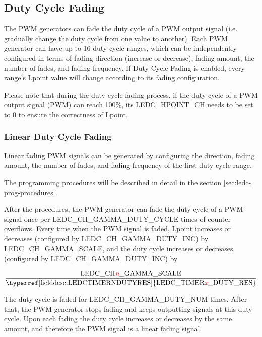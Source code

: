 \documentclass[main\_\_EN.tex]{subfiles}
\begin{document}
\subsection{Duty Cycle Fading}

The PWM generators can fade the duty cycle of a PWM output signal (i.e. gradually change the duty cycle from one value to another). Each PWM generator can have up to 16 duty cycle ranges, which can be independently configured in terms of fading direction (increase or decrease), fading amount, the number of fades, and fading frequency. If Duty Cycle Fading is enabled, every range's Lpoint value will change according to its fading configuration.

Please note that during the duty cycle fading process, if the duty cycle of a PWM output signal (PWM) can reach 100\%, its \hyperref[fielddesc:LEDCHPOINTCHN]{LEDC\_HPOINT\_CH} needs to be set to 0 to ensure the correctness of Lpoint.

\subsubsection{Linear Duty Cycle Fading}
\label{sec:ledc-pwm-linear-duty-cycle-fading}

Linear fading PWM signals can be generated by configuring the direction, fading amount, the number of fades, and fading frequency of the first duty cycle range.

The programming procedures will be described in detail in the section \ref{sec:ledc-prog-procedures}.

After the procedures, the PWM generator can fade the duty cycle of a PWM signal once per LEDC\_CH\_GAMMA\_DUTY\_CYCLE times of counter overflows. Every time when the PWM signal is faded, Lpoint increases or decreases (configured by LEDC\_CH\_GAMMA\_DUTY\_INC) by LEDC\_CH\_GAMMA\_SCALE, and the duty cycle increases or decreases (configured by LEDC\_CH\_GAMMA\_DUTY\_INC) by

\begin{equation}
    \frac{\textrm{LEDC\_CH\regindex{n}\_GAMMA\_SCALE}}{\textrm{\hyperref[fielddesc:LEDCTIMERNDUTYRES]{LEDC\_TIMER\regindex{x}\_DUTY\_RES}}}
\end{equation}

The duty cycle is faded for LEDC\_CH\_GAMMA\_DUTY\_NUM times. After that, the PWM generator stops fading and keeps outputting signals at this duty cycle. Upon each fading the duty cycle increases or decreases by the same amount, and therefore the PWM signal is a linear fading signal.
\end{document}
